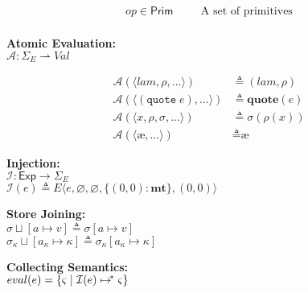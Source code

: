 \documentclass[12pt,draft]{article}
\newcommand\mae{\ensuremath{\text{\ae}}}
\newcommand{\quotesyn}[1]{(\texttt{quote}\;#1)}
\begin{document}
{\begin{multicols*}{2}
\begin{center}
\begin{align*}
  op \in \textsf{Prim} &\;\;\;\;\;\; \text{A set of primitives} \\
\end{align*}
\end{center}
\vspace{-7mm}
\begin{center}
  \textbf{Atomic Evaluation:} \\
  $\mathcal{A} : \Sigma_E \rightharpoonup \textit{Val}$
\vspace{-7mm}
\end{center}
\begin{align*}
  \mathcal{A}(\langle lam , \rho , ... \rangle)  &\triangleq (lam , \rho) \\
  \mathcal{A}(\langle \quotesyn{e} , ... \rangle) &\triangleq \textbf{quote}(e) \\
  \mathcal{A}(\langle x, \rho , \sigma , ... \rangle) &\triangleq \sigma(\rho(x)) \\
  \mathcal{A}(\langle \mae , ... \rangle) &\triangleq \mae
\end{align*}
\vspace{-9mm}
\begin{center}
\textbf{Injection:} \\
$\mathcal{I} : \textsf{Exp} \rightarrow \Sigma_E$ \\
$\mathcal{I}(e) \triangleq E\langle e , \varnothing , \varnothing , \{(0, 0) : \textbf{mt}\} , (0, 0) \rangle$
\end{center}
\vspace{-8mm}
\begin{center}
  \textbf{Store Joining:} \\
  $\sigma \sqcup [a \mapsto v] \triangleq \sigma[a \mapsto v]$ \\
  $\sigma_\kappa \sqcup [a_\kappa \mapsto \kappa] \triangleq
  \sigma_\kappa[a_\kappa \mapsto \kappa]$
\end{center}
\begin{center}
  \textbf{Collecting Semantics:} \\
  $eval(e) = \{\varsigma \;|\; \mathcal{I}(e) \mapsto\hspace{-1.5mm}^*\; \varsigma \}$
\end{center}
\vspace{-10mm}



\end{multicols*}}
\end{document}
